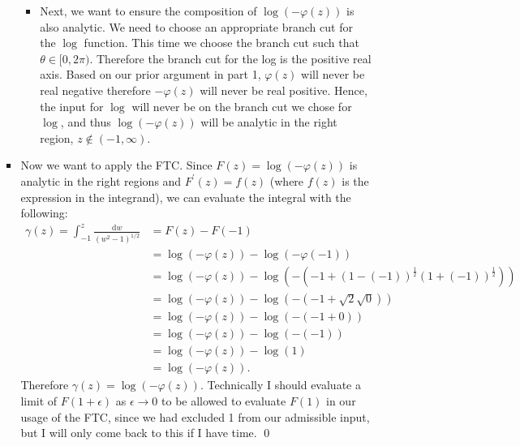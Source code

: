 \documentclass[10pt]{amsart}
\newcommand{\D}{\mathrm{d}}
\theoremstyle{nonumberplain}
\begin{document}
\begin{enumerate}[label={\bf {\arabic*}:}]
\begin{itemize}
\begin{itemize}
\begin{itemize}
   \item Next, we want to ensure the composition of $\log(-\varphi(z))$ is also analytic. We need to choose an appropriate branch cut for the $\log$ function. This time we choose the branch cut such that $\theta \in [0, 2\pi)$.
   Therefore the branch cut for the log is the positive real axis.
   Based on our prior argument in part 1, $\varphi(z)$ will never be real negative therefore $-\varphi(z)$ will never be real positive.
   Hence, the input for $\log$ will never be on the branch cut we chose for $\log$, and thus $\log(-\varphi(z))$ will be analytic in the right region, $z \not \in (-1, \infty)$.
 \end{itemize}
 \item Now we want to apply the FTC.
 Since $F(z) = \log(-\varphi(z))$ is analytic in the right regions and $F^\prime(z) = f(z)$ (where $f(z)$ is the expression in the integrand), we can evaluate the integral with the following:
 \begin{align*}
 \gamma(z) = \int_{-1}^z \frac{\D w}{(w^2 - 1)^{1/2}} &= F(z) - F(-1) \\
							&= \log(-\varphi(z)) - \log(-\varphi(-1)) \\
							&= \log(-\varphi(z)) - \log(-(-1 + (1 - (-1))^{\frac{1}{2}}(1 + (-1))^{\frac{1}{2}})) \\
							&= \log(-\varphi(z)) - \log(-(-1 + \sqrt{2}\sqrt{0})) \\
							&= \log(-\varphi(z)) - \log(-(-1 + 0)) \\
							&= \log(-\varphi(z)) - \log(-(-1)) \\
							&= \log(-\varphi(z))  - \log(1) \\
							&= \log(-\varphi(z)).
 \end{align*}
 Therefore $\gamma(z) = \log(-\varphi(z))$.
 Technically I should evaluate a limit of $F(1 + \epsilon)$ as $\epsilon \rightarrow 0$ to be allowed to evaluate $F(1)$ in our usage of the FTC, since we had excluded 1 from our admissible input, but I will only come back to this if I have time.
 \qed
 \\
 \end{itemize}
 \end{itemize}


\end{enumerate}
\end{document}
